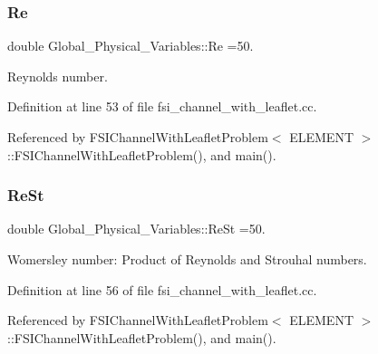 \subsubsection{\texorpdfstring{Re}{Re}}
{\footnotesize\ttfamily double Global\+\_\+\+Physical\+\_\+\+Variables\+::\+Re =50.}



Reynolds number. 



Definition at line 53 of file fsi\+\_\+channel\+\_\+with\+\_\+leaflet.\+cc.



Referenced by F\+S\+I\+Channel\+With\+Leaflet\+Problem$<$ E\+L\+E\+M\+E\+N\+T $>$\+::\+F\+S\+I\+Channel\+With\+Leaflet\+Problem(), and main().

\mbox{\label{namespaceGlobal__Physical__Variables_a085ee4bf968ffdd01a41b8c41864f907}} 
\subsubsection{\texorpdfstring{Re\+St}{ReSt}}
{\footnotesize\ttfamily double Global\+\_\+\+Physical\+\_\+\+Variables\+::\+Re\+St =50.}



Womersley number\+: Product of Reynolds and Strouhal numbers. 



Definition at line 56 of file fsi\+\_\+channel\+\_\+with\+\_\+leaflet.\+cc.



Referenced by F\+S\+I\+Channel\+With\+Leaflet\+Problem$<$ E\+L\+E\+M\+E\+N\+T $>$\+::\+F\+S\+I\+Channel\+With\+Leaflet\+Problem(), and main().

